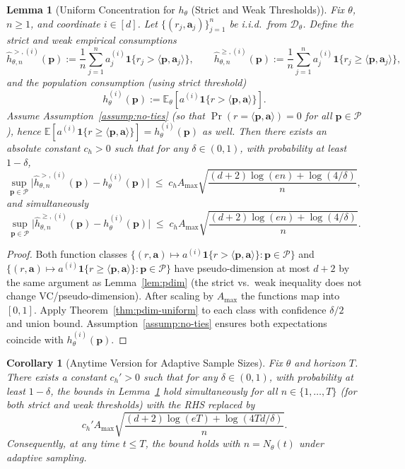 \documentclass[11pt]{article}
\newtheorem{lemma}[theorem]{Lemma}
\newtheorem{corollary}[theorem]{Corollary}
\newcommand{\ba}{\mathbf{a}}
\newcommand{\bp}{\mathbf{p}}
\newcommand{\E}{\mathbb{E}}
\newcommand{\cP}{\mathcal{P}}
\newcommand{\cD}{\mathcal{D}}
\begin{document}
\begin{lemma}[Uniform Concentration for $h_\theta$ (Strict and Weak Thresholds)]
\label{lem:conc-h}
Fix $\theta$, $n\ge 1$, and coordinate $i\in[d]$. Let $\{(r_j,\ba_j)\}_{j=1}^n$ be i.i.d.\ from $\cD_\theta$.
Define the strict and weak empirical consumptions
\[
\widehat h_{\theta,n}^{>,(i)}(\bp):=\frac1n\sum_{j=1}^n a_j^{(i)}\mathbf{1}\{r_j>\langle \bp,\ba_j\rangle\},\qquad
\widehat h_{\theta,n}^{\ge,(i)}(\bp):=\frac1n\sum_{j=1}^n a_j^{(i)}\mathbf{1}\{r_j\ge\langle \bp,\ba_j\rangle\},
\]
and the population consumption (using strict threshold)
\[
h_\theta^{(i)}(\bp):=\E_\theta\!\left[a^{(i)}\mathbf{1}\{r>\langle \bp,\ba\rangle\}\right].
\]
Assume Assumption~\ref{assump:no-ties} (so that $\Pr(r=\langle \bp,\ba\rangle)=0$ for all $\bp\in\cP$), hence
$\E[a^{(i)}\mathbf{1}\{r\ge\langle \bp,\ba\rangle\}]=h_\theta^{(i)}(\bp)$ as well.
Then there exists an absolute constant $c_h>0$ such that for any $\delta\in(0,1)$, with probability at least
$1-\delta$,
\[
\sup_{\bp\in\cP}\Big|\widehat h_{\theta,n}^{>,(i)}(\bp)-h_\theta^{(i)}(\bp)\Big|
\;\le\;
c_h A_{\max}\sqrt{\frac{(d+2)\log(en)+\log(4/\delta)}{n}},
\]
and simultaneously
\[
\sup_{\bp\in\cP}\Big|\widehat h_{\theta,n}^{\ge,(i)}(\bp)-h_\theta^{(i)}(\bp)\Big|
\;\le\;
c_h A_{\max}\sqrt{\frac{(d+2)\log(en)+\log(4/\delta)}{n}}.
\]
\end{lemma}

\begin{proof}
Both function classes
$\{(r,\ba)\mapsto a^{(i)}\mathbf{1}\{r>\langle \bp,\ba\rangle\}:\bp\in\cP\}$
and
$\{(r,\ba)\mapsto a^{(i)}\mathbf{1}\{r\ge\langle \bp,\ba\rangle\}:\bp\in\cP\}$
have pseudo-dimension at most $d+2$ by the same argument as Lemma~\ref{lem:pdim}
(the strict vs.\ weak inequality does not change VC/pseudo-dimension).
After scaling by $A_{\max}$ the functions map into $[0,1]$.
Apply Theorem~\ref{thm:pdim-uniform} to each class with confidence $\delta/2$ and union bound.
Assumption~\ref{assump:no-ties} ensures both expectations coincide with $h_\theta^{(i)}(\bp)$.
\end{proof}

\begin{corollary}[Anytime Version for Adaptive Sample Sizes]
\label{cor:conc-h-anytime}
Fix $\theta$ and horizon $T$. There exists a constant $c_h'>0$ such that for any $\delta\in(0,1)$,
with probability at least $1-\delta$, the bounds in Lemma~\ref{lem:conc-h} hold simultaneously
for all $n\in\{1,\dots,T\}$ (for both strict and weak thresholds) with the RHS replaced by
\[
c_h' A_{\max}\sqrt{\frac{(d+2)\log(eT)+\log(4Td/\delta)}{n}}.
\]
Consequently, at any time $t\le T$, the bound holds with $n=N_\theta(t)$ under adaptive sampling.
\end{corollary}
\end{document}
